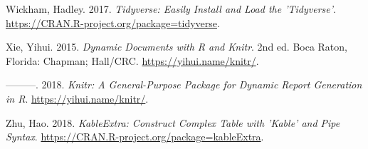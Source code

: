 \documentclass[smallextended]{svjour3}       %
\begin{document}
\leavevmode\hypertarget{ref-Wickham2017}{}%
Wickham, Hadley. 2017. \emph{Tidyverse: Easily Install and Load the
'Tidyverse'}. \url{https://CRAN.R-project.org/package=tidyverse}.

\leavevmode\hypertarget{ref-Xie2015}{}%
Xie, Yihui. 2015. \emph{Dynamic Documents with R and Knitr}. 2nd ed.
Boca Raton, Florida: Chapman; Hall/CRC. \url{https://yihui.name/knitr/}.

\leavevmode\hypertarget{ref-Xie2018}{}%
---------. 2018. \emph{Knitr: A General-Purpose Package for Dynamic
Report Generation in R}. \url{https://yihui.name/knitr/}.

\leavevmode\hypertarget{ref-Zhu2018}{}%
Zhu, Hao. 2018. \emph{KableExtra: Construct Complex Table with 'Kable'
and Pipe Syntax}. \url{https://CRAN.R-project.org/package=kableExtra}.



\end{document}
